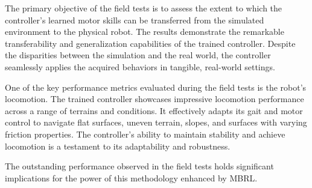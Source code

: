 The primary objective of the field tests is to assess the extent to which the controller's learned motor skills can be transferred from the simulated environment to the physical robot. The results demonstrate the remarkable transferability and generalization capabilities of the trained controller. Despite the disparities between the simulation and the real world, the controller seamlessly applies the acquired behaviors in tangible, real-world settings. 

One of the key performance metrics evaluated during the field tests is the robot's locomotion. The trained controller showcases impressive locomotion performance across a range of terrains and conditions. It effectively adapts its gait and motor control to navigate flat surfaces, uneven terrain, slopes, and surfaces with varying friction properties. The controller's ability to maintain stability and achieve locomotion is a testament to its adaptability and robustness.

The outstanding performance observed in the field tests holds significant implications for the power of this methodology enhanced by MBRL.